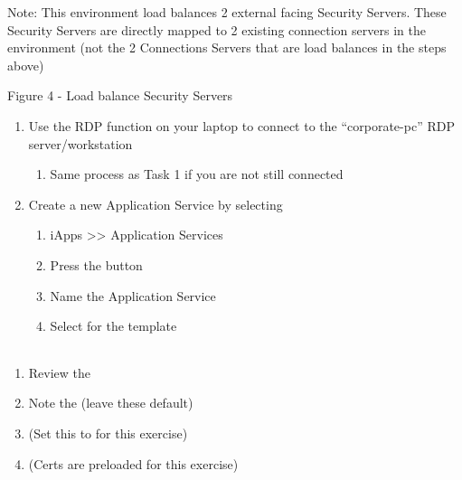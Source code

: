\documentclass[letterpaper,10pt,english]{sphinxmanual}
\begin{document}
Note: This environment load balances 2 external facing Security Servers.
These Security Servers are directly mapped to 2 existing connection
servers in the environment (not the 2 Connections Servers that are load
balances in the steps above)


Figure 4 - Load balance Security Servers

\begin{enumerate}
\item {} 
Use the RDP function on your laptop to connect to the “corporate-pc”
RDP server/workstation
\begin{enumerate}
\item {} 
Same process as Task 1 if you are not still connected

\end{enumerate}

\item {} 
Create a new Application Service by selecting
\begin{enumerate}
\item {} 
iApps \textgreater{}\textgreater{} Application Services

\item {} 
Press the  button

\item {} 
Name the Application Service 

\item {} 
Select  for the template

\end{enumerate}

\end{enumerate}


\begin{savenotes}\sphinxattablestart
\centering
\begin{tabulary}{\linewidth}[t]{|T|}
\hline
\\
\hline
\end{tabulary}
\par
\sphinxattableend\end{savenotes}
\begin{enumerate}
\item {} 
Review the 

\item {} 
Note the  (leave these default)

\item {} 
 (Set this to  for this
exercise)

\item {} 
 (Certs are preloaded for this exercise)

\end{enumerate}
\end{document}
